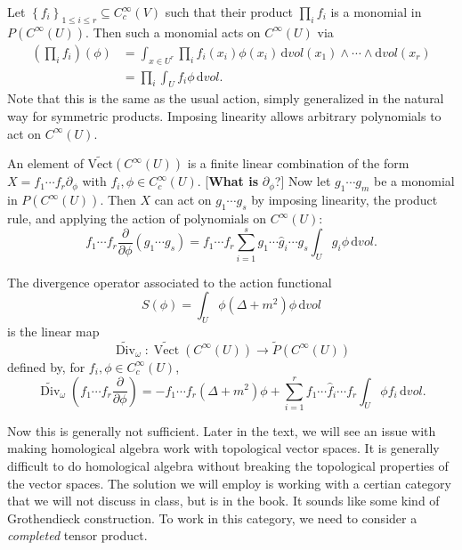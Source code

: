 Let $\left\{ f_i \right\} _{1\leq i\leq r} \subseteq  C^\infty _c(V)$ such that their product $\prod_{i} f_i$ is a monomial in $P(C^\infty (U))$. Then such a monomial acts on $C^\infty (U)$ via
\begin{align*}
	\left(\prod_{i} f_i\right)(\phi )&=\int_{x\in U^r}  \prod_{i} f_i(x_i)\phi(x_i) \,\mathrm{d}vol (x_1)\wedge \cdots \wedge \mathrm{d} vol (x_r)\\
			      &=\prod_{i} \int_U f_i\phi  \,\mathrm{d} vol 
.\end{align*}
Note that this is the same as the usual action, simply generalized in the natural way for symmetric products. Imposing linearity allows arbitrary polynomials to act on $C^\infty (U)$.


An element of $\widetilde{\mathrm{Vect} } (C^\infty (U))$ is a finite linear combination of the form $X=f_1 \cdots f_r  \partial_\phi $ with $f_i,\phi \in C^\infty _c(U)$. [\textbf{What is} $\partial _\phi $?] Now let $g_1 \cdots g_m$ be a monomial in $P(C^\infty (U))$. Then $X$ can act on $g_1 \cdots g_s$ by imposing linearity, the product rule, and applying the action of polynomials on $C^\infty (U)$:
\[
	f_1 \cdots f_r \frac{\partial }{\partial \phi } (g_1 \cdots g_s) = f_1 \cdots f_r \sum_{i=1}^{s} g_1 \cdots \widehat{g}_i \cdots g_s\int_U g_i\phi  \,\mathrm{d}vol
.\]

\begin{definition}\label{2.0.1}
	The divergence operator associated to the action functional
\[
	S(\phi )=\int _{U}\phi (\Delta +m^2)\phi  \,\mathrm{d} vol
\]
is the linear map
\[
	\widetilde{\operatorname{Div} }_\omega  : \widetilde{\operatorname{Vect}} (C^\infty (U)) \to \widetilde{P} (C^\infty (U))
\]
defined by, for $f_i,\phi \in C_c^\infty (U)$,
\[
	\widetilde{\operatorname{Div} } _\omega \left( f_1 \cdots f_r \frac{\partial }{\partial \phi }  \right) =-f_1 \cdots f_r\left( \Delta +m^2 \right) \phi +\sum_{i=1}^{r} f_1 \cdots \widehat{f}_i \cdots f_r \int_U\phi f_i \,\mathrm{d} vol
.\]
\end{definition}

Now this is generally not sufficient. Later in the text, we will see an issue with making homological algebra work with topological vector spaces. It is generally difficult to do homological algebra without breaking the topological properties of the vector spaces. The solution we will employ is working with a certian category that we will not discuss in class, but is in the book. It sounds like some kind of Grothendieck construction. To work in this category, we need to consider a \emph{completed} tensor product.

